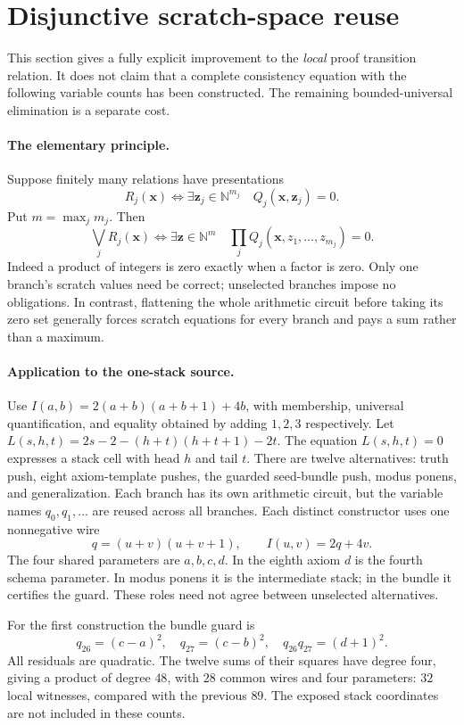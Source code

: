 \section{Disjunctive scratch-space reuse}
\label{sec:branchscratch}
This section gives a fully explicit improvement to the \emph{local} proof
transition relation. It does not claim that a complete consistency equation
with the following variable counts has been constructed. The remaining
bounded-universal elimination is a separate cost.

\paragraph{The elementary principle.}
Suppose finitely many relations have presentations
\[
 R_j(\mathbf x)\iff\exists\mathbf z_j\in\mathbb N^{m_j}\quad
 Q_j(\mathbf x,\mathbf z_j)=0.
\]
Put $m=\max_j m_j$. Then
\[
 \bigvee_j R_j(\mathbf x)\iff
 \exists\mathbf z\in\mathbb N^m\quad
 \prod_j Q_j(\mathbf x,z_1,\ldots,z_{m_j})=0.
\]
Indeed a product of integers is zero exactly when a factor is zero. Only
one branch's scratch values need be correct; unselected branches impose
no obligations. In contrast, flattening the whole arithmetic circuit
before taking its zero set generally forces scratch equations for every
branch and pays a sum rather than a maximum.

\paragraph{Application to the one-stack source.}
Use $I(a,b)=2(a+b)(a+b+1)+4b$, with membership, universal
quantification, and equality obtained by adding $1,2,3$ respectively.
Let $L(s,h,t)=2s-2-(h+t)(h+t+1)-2t$.
The equation $L(s,h,t)=0$ expresses a stack cell with head $h$ and tail $t$.
There are twelve alternatives: truth push, eight axiom-template pushes,
the guarded seed-bundle push, modus ponens, and generalization. Each
branch has its own arithmetic circuit, but the variable names
$q_0,q_1,\ldots$ are reused across all branches.
Each distinct constructor uses one nonnegative wire
\[
 q=(u+v)(u+v+1),\qquad I(u,v)=2q+4v.
\]
The four shared parameters are $a,b,c,d$. In the eighth axiom $d$ is the
fourth schema parameter. In modus ponens it is the intermediate stack;
in the bundle it certifies the guard. These roles need not agree between
unselected alternatives.

For the first construction the bundle guard is
\[
 q_{26}=(c-a)^2,\quad q_{27}=(c-b)^2,\quad
 q_{26}q_{27}=(d+1)^2.
\]
All residuals are quadratic. The twelve sums of their squares have degree
four, giving a product of degree $48$, with $28$ common wires and four
parameters: $32$ local witnesses, compared with the previous $89$.
The exposed stack coordinates are not included in these counts.

